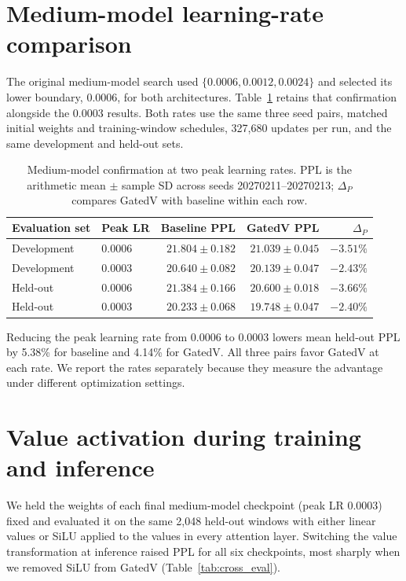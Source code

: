 \documentclass[11pt,a4paper]{article}
\begin{document}
\appendix
\section{Medium-model learning-rate comparison}
\label{sec:original_medium}
The original medium-model search used $\{0.0006,0.0012,0.0024\}$ and selected its lower boundary, 0.0006, for both architectures. Table~\ref{tab:medium_lr_confirmation} retains that confirmation alongside the 0.0003 results. Both rates use the same three seed pairs, matched initial weights and training-window schedules, 327,680 updates per run, and the same development and held-out sets.

\begin{table}[htbp]
\centering\small
\caption{Medium-model confirmation at two peak learning rates. PPL is the arithmetic mean $\pm$ sample SD across seeds 20270211--20270213; $\Delta_P$ compares GatedV with baseline within each row.}
\label{tab:medium_lr_confirmation}
\begin{tabular}{llrrr}
\toprule
Evaluation set & Peak LR & Baseline PPL & GatedV PPL & $\Delta_P$\\
\midrule
Development & 0.0006 & $21.804\pm0.182$ & $21.039\pm0.045$ & $-3.51\%$\\
Development & 0.0003 & $20.640\pm0.082$ & $20.139\pm0.047$ & $-2.43\%$\\
\midrule
Held-out & 0.0006 & $21.384\pm0.166$ & $20.600\pm0.018$ & $-3.66\%$\\
Held-out & 0.0003 & $20.233\pm0.068$ & $19.748\pm0.047$ & $-2.40\%$\\
\bottomrule
\end{tabular}
\end{table}

Reducing the peak learning rate from 0.0006 to 0.0003 lowers mean held-out PPL by 5.38\% for baseline and 4.14\% for GatedV. All three pairs favor GatedV at each rate. We report the rates separately because they measure the advantage under different optimization settings.

\FloatBarrier
\section{Value activation during training and inference}
\label{sec:cross_eval}
We held the weights of each final medium-model checkpoint (peak LR 0.0003) fixed and evaluated it on the same 2,048 held-out windows with either linear values or SiLU applied to the values in every attention layer. Switching the value transformation at inference raised PPL for all six checkpoints, most sharply when we removed SiLU from GatedV (Table~\ref{tab:cross_eval}).
\end{document}
